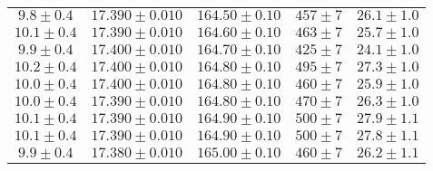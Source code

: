\begin{table}
\begin{tabular}{c c c c c}
        $9.8\pm0.4$ & $17.390\pm0.010$ & $164.50\pm0.10$ & $457\pm7$ & $26.1\pm1.0$ \\
        $10.1\pm0.4$ & $17.390\pm0.010$ & $164.60\pm0.10$ & $463\pm7$ & $25.7\pm1.0$ \\
        $9.9\pm0.4$ & $17.400\pm0.010$ & $164.70\pm0.10$ & $425\pm7$ & $24.1\pm1.0$ \\
        $10.2\pm0.4$ & $17.400\pm0.010$ & $164.80\pm0.10$ & $495\pm7$ & $27.3\pm1.0$ \\
        $10.0\pm0.4$ & $17.400\pm0.010$ & $164.80\pm0.10$ & $460\pm7$ & $25.9\pm1.0$ \\
        $10.0\pm0.4$ & $17.390\pm0.010$ & $164.80\pm0.10$ & $470\pm7$ & $26.3\pm1.0$ \\
        $10.1\pm0.4$ & $17.390\pm0.010$ & $164.90\pm0.10$ & $500\pm7$ & $27.9\pm1.1$ \\
        $10.1\pm0.4$ & $17.390\pm0.010$ & $164.90\pm0.10$ & $500\pm7$ & $27.8\pm1.1$ \\
        $9.9\pm0.4$ & $17.380\pm0.010$ & $165.00\pm0.10$ & $460\pm7$ & $26.2\pm1.1$ \\
        \bottomrule
    \end{tabular}
\end{table}

